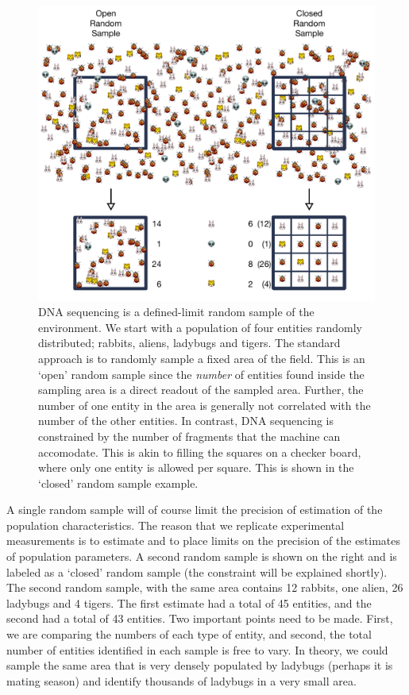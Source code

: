 \documentclass[
  onecolumn]{article}
\begin{document}
\begin{figure}
\centering
\includegraphics{figs/RALT.pdf}
\caption{\label{RALT} DNA sequencing is a defined-limit random sample of the environment. We start with a population of four entities randomly distributed; rabbits, aliens, ladybugs and tigers. The standard approach is to randomly sample a fixed area of the field. This is an `open' random sample since the \emph{number} of entities found inside the sampling area is a direct readout of the sampled area. Further, the number of one entity in the area is generally not correlated with the number of the other entities. In contrast, DNA sequencing is constrained by the number of fragments that the machine can accomodate. This is akin to filling the squares on a checker board, where only one entity is allowed per square. This is shown in the `closed' random sample example.}
\end{figure}

A single random sample will of course limit the precision of estimation of the population characteristics. The reason that we replicate experimental measurements is to estimate and to place limits on the precision of the estimates of population parameters. A second random sample is shown on the right and is labeled as a `closed' random sample (the constraint will be explained shortly). The second random sample, with the same area contains 12 rabbits, one alien, 26 ladybugs and 4 tigers. The first estimate had a total of 45 entities, and the second had a total of 43 entities. Two important points need to be made. First, we are comparing the numbers of each type of entity, and second, the total number of entities identified in each sample is free to vary. In theory, we could sample the same area that is very densely populated by ladybugs (perhaps it is mating season) and identify thousands of ladybugs in a very small area.
\end{document}
